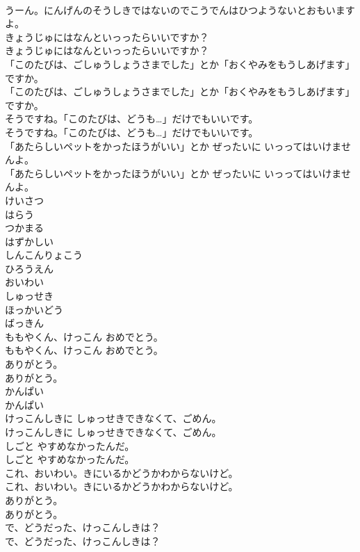 \documentclass[8pt]{extreport}
\begin{document}
\begin{CJK}{UTF8}{min}
\\	うーん。にんげんのそうしきではないのでこうでんはひつようないとおもいますよ。
\\	きょうじゅにはなんといっったらいいですか？
\\	きょうじゅにはなんといっったらいいですか？
\\	「このたびは、ごしゅうしょうさまでした」とか「おくやみをもうしあげます」ですか。
\\	「このたびは、ごしゅうしょうさまでした」とか「おくやみをもうしあげます」ですか。
\\	そうですね。「このたびは、どうも…」だけでもいいです。
\\	そうですね。「このたびは、どうも…」だけでもいいです。
\\	「あたらしいペットをかったほうがいい」とか ぜったいに いっってはいけませんよ。
\\	「あたらしいペットをかったほうがいい」とか ぜったいに いっってはいけませんよ。
\\	けいさつ
\\	はらう
\\	つかまる
\\	はずかしい
\\	しんこんりょこう
\\	ひろうえん
\\	おいわい
\\	しゅっせき
\\	ほっかいどう
\\	ばっきん
\\	ももやくん、けっこん おめでとう。
\\	ももやくん、けっこん おめでとう。
\\	ありがとう。
\\	ありがとう。
\\	かんぱい
\\	かんぱい
\\	けっこんしきに しゅっせきできなくて、ごめん。
\\	けっこんしきに しゅっせきできなくて、ごめん。
\\	しごと やすめなかったんだ。
\\	しごと やすめなかったんだ。
\\	これ、おいわい。きにいるかどうかわからないけど。
\\	これ、おいわい。きにいるかどうかわからないけど。
\\	ありがとう。
\\	ありがとう。
\\	で、どうだった、けっこんしきは？
\\	で、どうだった、けっこんしきは？

\end{CJK}
\end{document}
